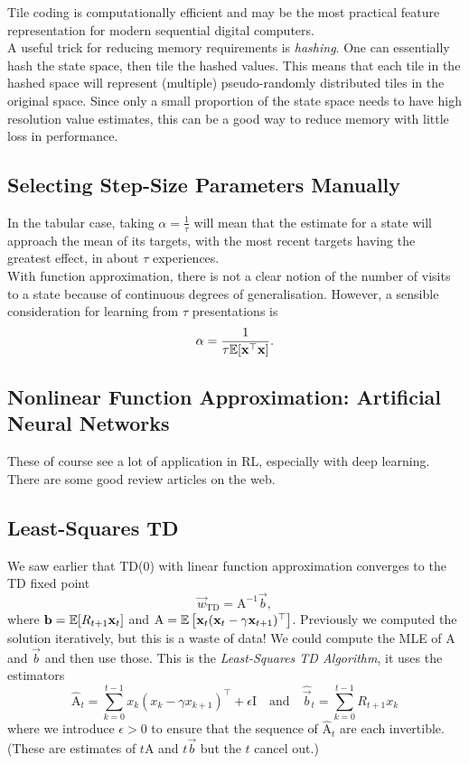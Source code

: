 Tile coding is computationally efficient and may be the most practical feature representation for modern sequential digital computers.\\

A useful trick for reducing memory requirements is \emph{hashing}. One can essentially hash the state space, then tile the hashed values. This means that each tile in the hashed space will represent (multiple) pseudo-randomly distributed tiles in the original space. Since only a small proportion of the state space needs to have high resolution value estimates, this can be a good way to reduce memory with little loss in performance.

\subsection{Selecting Step-Size Parameters Manually}
In the tabular case, taking $\alpha = \frac1\tau$ will mean that the estimate for a state will approach the mean of its targets, with the most recent targets having the greatest effect, in about $\tau$ experiences.\\

With function approximation, there is not a clear notion of the number of visits to a state because of continuous degrees of generalisation. However, a sensible consideration for learning from $\tau$ presentations is 
\begin{equation}
    \alpha = \frac{1}{\tau \mathbb{E}{}[\mathbf{x}^\top\mathbf{x}]}.
\end{equation}

\subsection{Nonlinear Function Approximation: Artificial Neural Networks}
These of course see a lot of application in RL, especially with deep learning. There are some good review articles on the web.

\subsection{Least-Squares TD}
We saw earlier that TD(0) with linear function approximation converges to the TD fixed point 
\[
    \vec{w}_{\text{TD}} = \mathrm{A}^{-1}\vec{b},
\]
where $\mathbf{b} = \mathbb{E}{}[R_{t+1}\mathbf{x}_t]$ and $\mathrm{A} = \mathbb{E}{}\left[\mathbf{x}_t(\mathbf{x}_t - \gamma\mathbf{x}_{t+1})^\top\right]$. Previously we computed the solution iteratively, but this is a waste of data! We could compute the MLE of $\mathrm{A}$ and $\vec{b}$ and then use those. This is the \emph{Least-Squares TD Algorithm}, it uses the estimators
\begin{equation}
    \hat{\mathrm{A}}_t = \sum_{k=0}^{t-1} x_k ( x_k - \gamma x_{k+1})^\top + \epsilon \mathrm{I} \quad \mathrm{and} \quad \hat{\vec{b}}_t = \sum_{k=0}^{t-1} R_{t+1} x_k 
\end{equation}
where we introduce $\epsilon > 0$ to ensure that the sequence of $\hat{\mathrm{A}}_t$ are each invertible. (These are estimates of $t\mathrm{A}$ and $t\vec{b}$ but the $t$ cancel out.)\\

